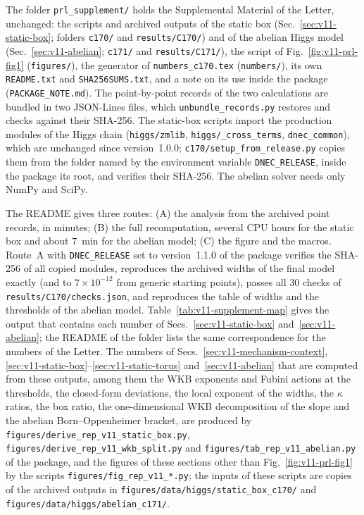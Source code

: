 The folder \texttt{prl\_supplement/} holds the Supplemental Material of the Letter, unchanged: the scripts and archived outputs of the static box (Sec.~\ref{sec:v11-static-box}; folders \texttt{c170/} and \texttt{results/C170/}) and of the abelian Higgs model (Sec.~\ref{sec:v11-abelian}; \texttt{c171/} and \texttt{results/C171/}), the script of Fig.~\ref{fig:v11-prl-fig1} (\texttt{figures/}), the generator of \texttt{numbers\_c170.tex} (\texttt{numbers/}), its own \texttt{README.txt} and \texttt{SHA256SUMS.txt}, and a note on its use inside the package (\texttt{PACKAGE\_NOTE.md}).
The point-by-point records of the two calculations are bundled in two JSON-Lines files, which \texttt{unbundle\_records.py} restores and checks against their SHA-256.
The static-box scripts import the production modules of the Higgs chain (\texttt{higgs/\allowbreak zmlib}, \texttt{higgs/\_cross\_terms}, \texttt{dnec\_common}), which are unchanged since version~1.0.0; \texttt{c170/\allowbreak setup\_from\_release.py} copies them from the folder named by the environment variable \texttt{DNEC\_RELEASE}, inside the package its root, and verifies their SHA-256.
The abelian solver needs only NumPy and SciPy.

The README gives three routes: (A) the analysis from the archived point records, in minutes; (B) the full recomputation, several CPU hours for the static box and about $7$~min for the abelian model; (C) the figure and the macros. %
Route~A with \texttt{DNEC\_RELEASE} set to version~1.1.0 of the package verifies the SHA-256 of all copied modules, reproduces the archived widths of the final model exactly (and to $7\times10^{-12}$ from generic starting points), passes all 30 checks of \texttt{results/\allowbreak C170/\allowbreak checks.json}, and reproduces the table of widths and the thresholds of the abelian model. %
Table~\ref{tab:v11-supplement-map} gives the output that contains each number of Secs.~\ref{sec:v11-static-box} and~\ref{sec:v11-abelian}; the README of the folder lists the same correspondence for the numbers of the Letter.
The numbers of Secs.~\ref{sec:v11-mechanism-context}, \ref{sec:v11-static-box}--\ref{sec:v11-static-torus} and~\ref{sec:v11-abelian} that are computed from these outputs, among them the WKB exponents and Fubini actions at the thresholds, the closed-form deviations, the local exponent of the widths, the $\kappa$ ratios, the box ratio, the one-dimensional WKB decomposition of the slope and the abelian Born--Oppenheimer bracket, are produced by \texttt{figures/\allowbreak derive\_rep\_v11\_static\_box.py}, \texttt{figures/\allowbreak derive\_rep\_v11\_wkb\_split.py} and \texttt{figures/\allowbreak tab\_rep\_v11\_abelian.py} of the package, and the figures of these sections other than Fig.~\ref{fig:v11-prl-fig1} by the scripts \texttt{figures/\allowbreak fig\_rep\_v11\_*.py}; the inputs of these scripts are copies of the archived outputs in \texttt{figures/\allowbreak data/\allowbreak higgs/\allowbreak static\_box\_c170/} and \texttt{figures/\allowbreak data/\allowbreak higgs/\allowbreak abelian\_c171/}.

